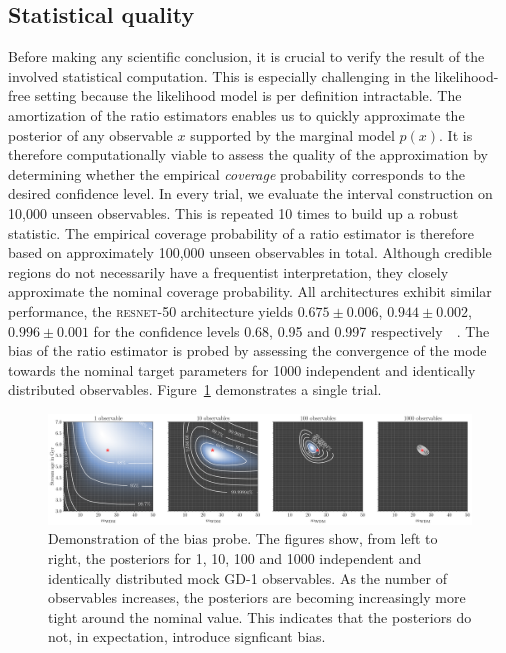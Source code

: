 \documentclass{article}
\begin{document}
\subsection{Statistical quality}
\label{sec:diagnostics}
Before making any scientific conclusion, it
is crucial to verify the result of the involved statistical computation.
This is especially challenging in the likelihood-free setting because
the likelihood model is per definition intractable.
The amortization of the ratio estimators enables us to quickly
approximate the posterior of any observable $x$ supported
by the marginal model $p(x)$. It is therefore computationally viable
to assess the quality of the approximation
by determining whether the empirical \emph{coverage}
probability corresponds to the desired confidence level.
In every trial, we evaluate the interval construction on 10,000 unseen observables.
This is repeated 10 times to build up a robust statistic.
The empirical coverage probability of a ratio estimator is therefore based
on approximately 100,000 unseen observables in total.
Although credible regions do not necessarily have a frequentist interpretation, they
closely approximate the nominal coverage probability.
All architectures exhibit similar performance, the \textsc{resnet-50} architecture yields $0.675\pm 0.006$, $0.944\pm 0.002$, $0.996\pm 0.001$ for the confidence levels 0.68, 0.95 and 0.997 respectively~~\protect{}. The bias of the ratio estimator is probed by assessing the convergence of the mode towards the nominal target parameters for 1000 independent and identically distributed observables. Figure~\ref{fig:diagnostic_map_convergence} demonstrates a single trial.
\begin{figure}
    \centering
    \includegraphics[width=\linewidth]{figures/diagnostic_map_convergence.pdf}
    \caption{Demonstration of the bias probe.
      The figures show, from left to right, the posteriors for 1, 10, 100 and 1000 independent and identically
      distributed mock GD-1 observables.
      As the number of observables increases,
      the posteriors are becoming increasingly more tight around the nominal value.
      This indicates that the posteriors do not, in expectation, introduce signficant bias.
      ~~\protect{}}
    \label{fig:diagnostic_map_convergence}
\end{figure}
\end{document}
